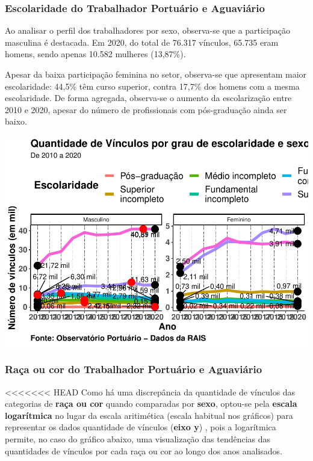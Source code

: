 \documentclass[
]{article}
\begin{document}
\hypertarget{escolaridade-do-trabalhador-portuuxe1rio-e-aguaviuxe1rio}{%
\subsubsection{Escolaridade do Trabalhador Portuário e
Aguaviário}\label{escolaridade-do-trabalhador-portuuxe1rio-e-aguaviuxe1rio}}

Ao analisar o perfil dos trabalhadores por sexo, observa-se que a
participação masculina é destacada. Em 2020, do total de 76.317
vínculos, 65.735 eram homens, sendo apenas 10.582 mulheres (13,87\%).

Apesar da baixa participação feminina no setor, observa-se que
apresentam maior escolaridade: 44,5\% têm curso superior, contra 17,7\%
dos homens com a mesma escolaridade. De forma agregada, observa-se o
aumento da escolarização entre 2010 e 2020, apesar do número de
profissionais com pós-graduação ainda ser baixo.

\includegraphics{mercado_trabalho_files/figure-latex/g_operacao_escol_sexo-1.pdf}

\hypertarget{rauxe7a-ou-cor-do-trabalhador-portuuxe1rio-e-aguaviuxe1rio}{%
\subsubsection{Raça ou cor do Trabalhador Portuário e
Aguaviário}\label{rauxe7a-ou-cor-do-trabalhador-portuuxe1rio-e-aguaviuxe1rio}}

\textless\textless\textless\textless\textless\textless\textless{} HEAD
Como há uma discrepância da quantidade de vínculos das categorias de
\textbf{raça ou cor} quando comparadas por \textbf{sexo}, optou-se pela
\textbf{escala logarítmica} no lugar da escala aritimética (escala
habitual nos gráficos) para representar os dados quantidade de vínculos
(\textbf{eixo y}) , pois a logarítmica permite, no caso do gráfico
abaixo, uma visualização das tendências das quantidades de vínculos por
cada raça ou cor ao longo dos anos analisados.
\end{document}
